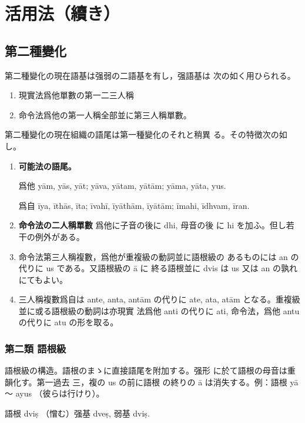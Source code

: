 \section{活用法（續き）}
\subsection{第二種變化}
\numberParagraph \label{np:136}
第二種變化の現在語基は强弱の二語基を有し，强語基は
次の如く用ひられる。
\begin{enumerate}[label=(\alph*)]
\item 現實法爲他單數の第一二三人稱
\item 命令法爲他の第一人稱全部並に第三人稱單數。
\end{enumerate}

\numberParagraph
第二種變化の現在組織の語尾は第一種變化のそれと稍異
る。その特徴次の如し。
\begin{enumerate}[label=(\alph*)]
\item \textbf{可能法の語尾。}

爲他 yām, yās, yāt; yāva, yātam, yātām; yāma,
yāta, yus.

爲自 īya, īthās, īta; īvahī, īyāthām, īyātām; īmahi,
īdhvam, īran.
\item \textbf{命令法の二人稱單數} 爲他に子音の後に dhi, 母音の後
に hi を加ふ。但し若干の例外がある。
\item 命令法第三人稱複數，爲他が重複級の動詞並に語根級の
あるものには an の代りに us である。又語根級の ā に
終る語根並に dvis は us 又は an の孰れにてもよい。
\item 三人稱複數爲自は ante, anta, antām の代りに ate,
ata, atām となる。重複級並に或る語根級の動詞は亦現實
法爲他 anti の代りに ati, 命令法，爲他 antu の代りに
atu の形を取る。
\end{enumerate}

\subsubsection{第二類 語根級}
\numberParagraph
語根級の構造。語根のまゝに直接語尾を附加する。强形
に於て語根の母音は重韻化す。第一過去 三，複の us の前に語根
の終りの ā は消失する。例：語根 yā ～ ayus （彼らは行けり）。

\numberParagraph
語根 dviṣ （憎む）强基 dveṣ, 弱基 dviṣ.


